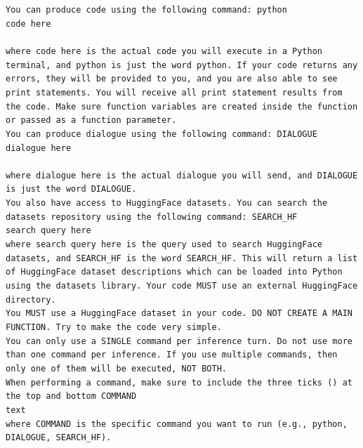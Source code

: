 \documentclass[11pt, a4paper]{gdm_format}
\begin{document}
\begin{tcolorbox}[breakable,colback=orange!5!white, colframe=orange!80!black, title=ML Engineer Data Preparation Command Prompt]
\texttt{You can produce code using the following command: \textasciigrave\textasciigrave\textasciigrave python\\
code here\\\textasciigrave\textasciigrave\textasciigrave\\ where code here is the actual code you will execute in a Python terminal, and python is just the word python. If your code returns any errors, they will be provided to you, and you are also able to see print statements. You will receive all print statement results from the code. Make sure function variables are created inside the function or passed as a function parameter.\\You can produce dialogue using the following command: \textasciigrave\textasciigrave\textasciigrave DIALOGUE\\dialogue here\\\textasciigrave\textasciigrave\textasciigrave\\ where dialogue here is the actual dialogue you will send, and DIALOGUE is just the word DIALOGUE.\\You also have access to HuggingFace datasets. You can search the datasets repository using the following command: \textasciigrave\textasciigrave\textasciigrave SEARCH\_HF\\search query here\\\textasciigrave\textasciigrave\textasciigrave where search query here is the query used to search HuggingFace datasets, and SEARCH\_HF is the word SEARCH\_HF. This will return a list of HuggingFace dataset descriptions which can be loaded into Python using the datasets library. Your code MUST use an external HuggingFace directory.\\You MUST use a HuggingFace dataset in your code. DO NOT CREATE A MAIN FUNCTION. Try to make the code very simple.\\You can only use a SINGLE command per inference turn. Do not use more than one command per inference. If you use multiple commands, then only one of them will be executed, NOT BOTH.\\When performing a command, make sure to include the three ticks (\textasciigrave\textasciigrave\textasciigrave) at the top and bottom \textasciigrave\textasciigrave\textasciigrave COMMAND\\text\\\textasciigrave\textasciigrave\textasciigrave where COMMAND is the specific command you want to run (e.g., python, DIALOGUE, SEARCH\_HF).}
\end{tcolorbox}
\end{document}

